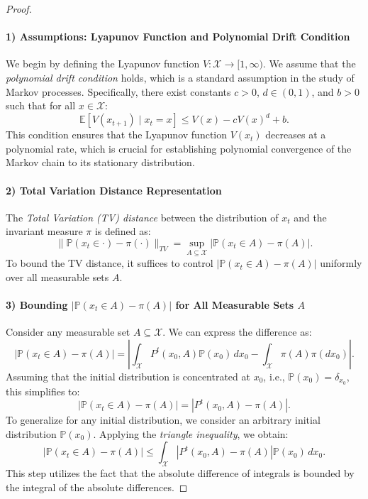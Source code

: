 \begin{proof}
\paragraph{1) Assumptions: Lyapunov Function and Polynomial Drift Condition}

We begin by defining the Lyapunov function \( V: \mathcal{X} \to [1,\infty) \). We assume that the \emph{polynomial drift condition} holds, which is a standard assumption in the study of Markov processes. Specifically, there exist constants \( c > 0 \), \( d \in (0,1) \), and \( b > 0 \) such that for all \( x \in \mathcal{X} \):
\[
\mathbb{E}[V(x_{t+1}) \mid x_t = x] \leq V(x) - c V(x)^d + b.
\]
This condition ensures that the Lyapunov function \( V(x_t) \) decreases at a polynomial rate, which is crucial for establishing polynomial convergence of the Markov chain to its stationary distribution.

\paragraph{2) Total Variation Distance Representation}

The \emph{Total Variation (TV) distance} between the distribution of \( x_t \) and the invariant measure \( \pi \) is defined as:
\[
\|\mathbb{P}(x_t \in \cdot) - \pi(\cdot)\|_{TV} = \sup_{A \subseteq \mathcal{X}} |\mathbb{P}(x_t \in A) - \pi(A)|.
\]
To bound the TV distance, it suffices to control \( |\mathbb{P}(x_t \in A) - \pi(A)| \) uniformly over all measurable sets \( A \).

\paragraph{3) Bounding \( |\mathbb{P}(x_t \in A) - \pi(A)| \) for All Measurable Sets \( A \)}

Consider any measurable set \( A \subseteq \mathcal{X} \). We can express the difference as:
\[
|\mathbb{P}(x_t \in A) - \pi(A)| = \left| \int_{\mathcal{X}} P^t(x_0, A) \mathbb{P}(x_0) \, dx_0 - \int_{\mathcal{X}} \pi(A) \pi(dx_0) \right|.
\]
Assuming that the initial distribution is concentrated at \( x_0 \), i.e., \( \mathbb{P}(x_0) = \delta_{x_0} \), this simplifies to:
\[
|\mathbb{P}(x_t \in A) - \pi(A)| = |P^t(x_0, A) - \pi(A)|.
\]
To generalize for any initial distribution, we consider an arbitrary initial distribution \( \mathbb{P}(x_0) \). Applying the \emph{triangle inequality}, we obtain:
\[
|\mathbb{P}(x_t \in A) - \pi(A)| \leq \int_{\mathcal{X}} |P^t(x_0, A) - \pi(A)| \mathbb{P}(x_0) \, dx_0.
\]
This step utilizes the fact that the absolute difference of integrals is bounded by the integral of the absolute differences.


\end{proof}

